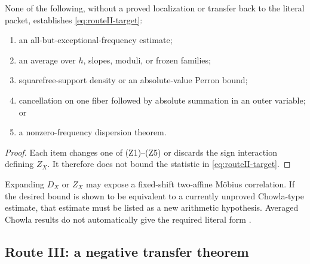 \begin{proposition}
\label{prop:not-routeII}
None of the following, without a proved localization or transfer back
to the literal packet, establishes \eqref{eq:routeII-target}:
\begin{enumerate}[label=(\roman*),leftmargin=2.2em]
\item an all-but-exceptional-frequency estimate;
\item an average over \(h\), slopes, moduli, or frozen families;
\item squarefree-support density or an absolute-value Perron bound;
\item cancellation on one fiber followed by absolute summation in an
outer variable; or
\item a nonzero-frequency dispersion theorem.
\end{enumerate}
\end{proposition}

\begin{proof}
Each item changes one of (Z1)--(Z5) or discards the sign interaction
defining \(Z_X\).  It therefore does not bound the statistic in
\eqref{eq:routeII-target}.
\end{proof}

Expanding \(D_X\) or \(Z_X\) may expose a fixed-shift two-affine
M\"obius correlation.  If the desired bound is shown to be equivalent
to a currently unproved Chowla-type estimate, that estimate must be
listed as a new arithmetic hypothesis.  Averaged Chowla results do
not automatically give the required literal form
\citep{MatomakiRadziwillTao2015,Tao2016LogChowla}.

\subsection{Route III: a negative transfer theorem}

